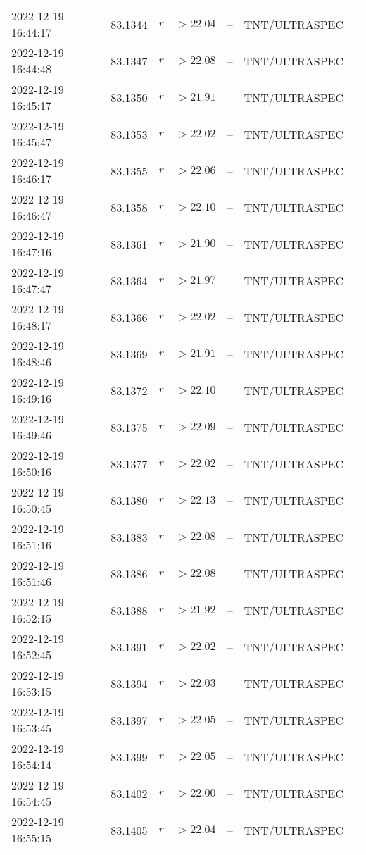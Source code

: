\documentclass{nature_plusfigure}
\begin{document}
\begin{supplement}
\begin{center}
\begin{longtable}{lllllll}
2022-12-19 16:44:17 & 83.1344 & $r$ & $>22.04$ & -- & TNT/ULTRASPEC &  \\ 
2022-12-19 16:44:48 & 83.1347 & $r$ & $>22.08$ & -- & TNT/ULTRASPEC &  \\ 
2022-12-19 16:45:17 & 83.1350 & $r$ & $>21.91$ & -- & TNT/ULTRASPEC &  \\ 
2022-12-19 16:45:47 & 83.1353 & $r$ & $>22.02$ & -- & TNT/ULTRASPEC &  \\ 
2022-12-19 16:46:17 & 83.1355 & $r$ & $>22.06$ & -- & TNT/ULTRASPEC &  \\ 
2022-12-19 16:46:47 & 83.1358 & $r$ & $>22.10$ & -- & TNT/ULTRASPEC &  \\ 
2022-12-19 16:47:16 & 83.1361 & $r$ & $>21.90$ & -- & TNT/ULTRASPEC &  \\ 
2022-12-19 16:47:47 & 83.1364 & $r$ & $>21.97$ & -- & TNT/ULTRASPEC &  \\ 
2022-12-19 16:48:17 & 83.1366 & $r$ & $>22.02$ & -- & TNT/ULTRASPEC &  \\ 
2022-12-19 16:48:46 & 83.1369 & $r$ & $>21.91$ & -- & TNT/ULTRASPEC &  \\ 
2022-12-19 16:49:16 & 83.1372 & $r$ & $>22.10$ & -- & TNT/ULTRASPEC &  \\ 
2022-12-19 16:49:46 & 83.1375 & $r$ & $>22.09$ & -- & TNT/ULTRASPEC &  \\ 
2022-12-19 16:50:16 & 83.1377 & $r$ & $>22.02$ & -- & TNT/ULTRASPEC &  \\ 
2022-12-19 16:50:45 & 83.1380 & $r$ & $>22.13$ & -- & TNT/ULTRASPEC &  \\ 
2022-12-19 16:51:16 & 83.1383 & $r$ & $>22.08$ & -- & TNT/ULTRASPEC &  \\ 
2022-12-19 16:51:46 & 83.1386 & $r$ & $>22.08$ & -- & TNT/ULTRASPEC &  \\ 
2022-12-19 16:52:15 & 83.1388 & $r$ & $>21.92$ & -- & TNT/ULTRASPEC &  \\ 
2022-12-19 16:52:45 & 83.1391 & $r$ & $>22.02$ & -- & TNT/ULTRASPEC &  \\ 
2022-12-19 16:53:15 & 83.1394 & $r$ & $>22.03$ & -- & TNT/ULTRASPEC &  \\ 
2022-12-19 16:53:45 & 83.1397 & $r$ & $>22.05$ & -- & TNT/ULTRASPEC &  \\ 
2022-12-19 16:54:14 & 83.1399 & $r$ & $>22.05$ & -- & TNT/ULTRASPEC &  \\ 
2022-12-19 16:54:45 & 83.1402 & $r$ & $>22.00$ & -- & TNT/ULTRASPEC &  \\ 
2022-12-19 16:55:15 & 83.1405 & $r$ & $>22.04$ & -- & TNT/ULTRASPEC &  \\ 

\end{longtable}
\end{center}
\end{supplement}
\end{document}
